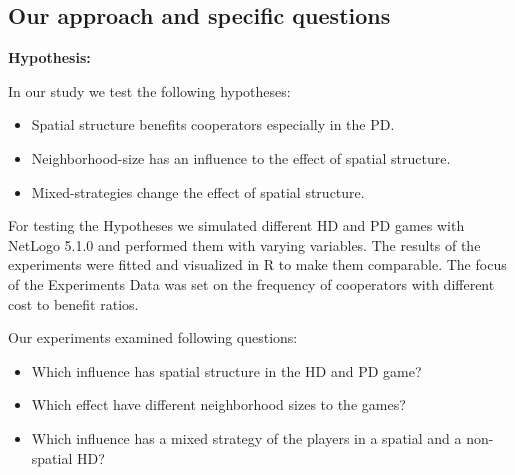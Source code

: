 \subsection{Our approach and specific questions}
\textbf{Hypothesis:}

In our study we test the following hypotheses: 

\begin{itemize}
\item Spatial structure benefits cooperators especially in the PD.
\item Neighborhood-size has an influence to the effect of spatial structure.
\item Mixed-strategies change the effect of spatial structure.
\end{itemize}

For testing the Hypotheses we simulated different HD and PD games with NetLogo 5.1.0 and performed them with varying variables. The results of the experiments were fitted and visualized in R \citep{R} to make them comparable. The focus of the Experiments Data was set on the frequency of cooperators with different cost to benefit ratios.

Our experiments examined following questions:
\begin{itemize}
\item Which influence has spatial structure in the HD and PD game?
\item Which effect have different neighborhood sizes to the games?
\item Which influence has a mixed strategy of the players in a spatial and a non-spatial HD?
\end{itemize}
